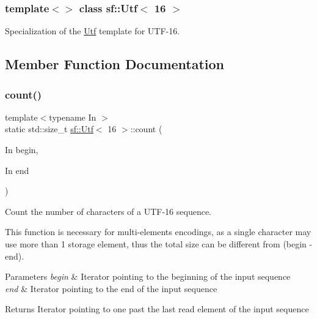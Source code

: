 \subsubsection*{template$<$$>$\newline
class sf\+::\+Utf$<$ 16 $>$}

Specialization of the \mbox{\hyperlink{classsf_1_1_utf}{Utf}} template for U\+T\+F-\/16. 

\begin{DoxyVerb}\end{DoxyVerb}
 

\subsection{Member Function Documentation}
\mbox{\label{classsf_1_1_utf_3_0116_01_4_a6df8d9be8211ffe1095b3b82eac83f6f}} 
\subsubsection{\texorpdfstring{count()}{count()}}
{\footnotesize\ttfamily template$<$typename In $>$ \\
static std\+::size\+\_\+t \mbox{\hyperlink{classsf_1_1_utf}{sf\+::\+Utf}}$<$ 16 $>$\+::count (\begin{DoxyParamCaption}\item[{In}]{begin,  }\item[{In}]{end }\end{DoxyParamCaption})\hspace{0.3cm}{\ttfamily [static]}}



Count the number of characters of a U\+T\+F-\/16 sequence. 

This function is necessary for multi-\/elements encodings, as a single character may use more than 1 storage element, thus the total size can be different from (begin -\/ end).


\begin{DoxyParams}{Parameters}
{\em begin} & Iterator pointing to the beginning of the input sequence \\
\hline
{\em end} & Iterator pointing to the end of the input sequence\\
\hline
\end{DoxyParams}
\begin{DoxyReturn}{Returns}
Iterator pointing to one past the last read element of the input sequence \begin{DoxyVerb}\end{DoxyVerb}
 
\end{DoxyReturn}
\mbox{\label{classsf_1_1_utf_3_0116_01_4_a17be6fc08e51182e7ac8bf9269dfae37}} 

